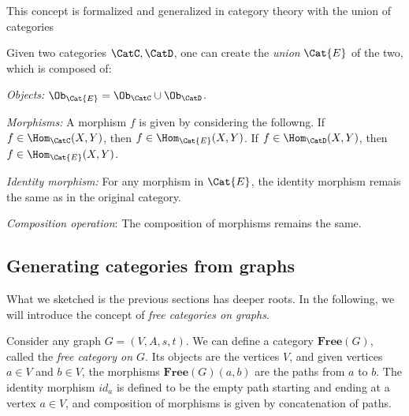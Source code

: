 \noindent This concept is formalized and generalized in category theory with the union of categories
\begin{shaded}
\begin{definition}
Given two categories $\CatC,\CatD$, one can create the \emph{union} $\Cat{E}$ of the two, which is composed of:
\begin{compactenum}
\item \emph{Objects:} $\Ob_\Cat{E}=\Ob_\CatC \cup \Ob_\CatD$.
\item \emph{Morphisms:} A morphism $f$ is given by considering the followng. If $f\in \Hom_\CatC(X,Y)$, then $f\in \Hom_\Cat{E}(X,Y)$. If $f\in \Hom_\CatD(X,Y)$, then $f\in \Hom_\Cat{E}(X,Y)$.
\item \emph{Identity morphism:} For any morphism in $\Cat{E}$, the identity morphism remais the same as in the original category.
\item \emph{Composition operation}: The composition of morphisms remains the same.
\end{compactenum}
\end{definition}
\end{shaded}

\subsection{Generating categories from graphs}
What we sketched is the previous sections has deeper roots. In the following, we will introduce the concept of \emph{free categories on graphs}.

\begin{shaded}
\begin{definition}
Consider any graph $G=(V,A,s,t)$. We can define a category $\mathbf{Free}(G)$, called the \emph{free category on $G$}. Its objects are the vertices $V$, and given vertices $a\in V$ and $b\in V$, the morphisms $\mathbf{Free}(G)(a,b)$ are the paths from $a$ to $b$. 
The identity morphism $id_a$ is defined to be the empty path starting and ending at a vertex $a \in V$, and composition of morphisms is given by concatenation of paths.
\end{definition}
\end{shaded}


